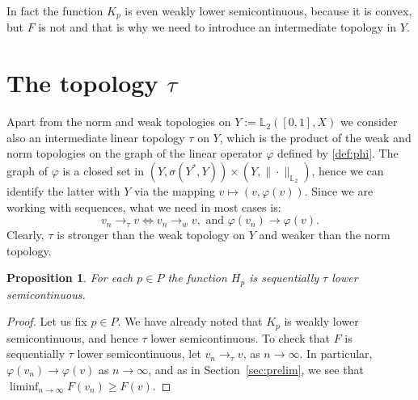 \documentclass[12pt,leqno]{article}
\newtheorem{prop}[thm]{Proposition}   %
\theoremstyle{definition}
\theoremstyle{remark}
\def\ds{\displaystyle}
\def\L{\mathbb{L}}
\begin{document}
In fact the function $K_p$ is even weakly lower semicontinuous, because it is convex, but $F$ is not and that is why we need to introduce an intermediate topology in $Y$.

\section{The topology $\tau$}\label{sec:topol}

    Apart from the norm and weak topologies on $Y := \L_2([0,1],X)$ we consider also an intermediate linear topology $\tau$ on $Y$, which is the product of the weak and norm topologies on the graph of the linear operator $\varphi$ defined by \eqref{def:phi}. The graph of $\varphi$  is a closed set in $(Y,\sigma(Y^*,Y))\times (Y,\|\cdot\|_{\L_2})$, hence we can identify the latter with $Y$ via the mapping $v\mapsto (v,\varphi(v))$. Since we are working with sequences, what we need in most cases is:
    $$
         v_n\to_\tau v \iff
             v_n \to_w v, \text{ and }
             \varphi(v_n) \to \varphi(v).
          $$
    Clearly, $\tau$ is stronger than the weak topology on $Y$ and weaker than the norm topology.

    \begin{prop}
        For each $p\in P$ the function $H_p$ is sequentially $\tau$ lower semicontinuous.
    \end{prop}
    \begin{proof}
       Let us fix $p\in P$.
        We have already noted that $K_p$ is weakly lower semicontinuous, and hence $\tau$ lower semicontinuous. To check that $F$   is  sequentially $\tau$  lower semicontinuous, let $v_n\to_\tau v$, as $n\to\infty$. In particular, $\varphi(v_n)\to  \varphi(v)$ as $n\to\infty$, and as in Section~\ref{sec:prelim}, we see that
        $\ds
            \liminf_{n\to\infty} F(v_n) \ge F(v)$.
    \end{proof}
\end{document}
